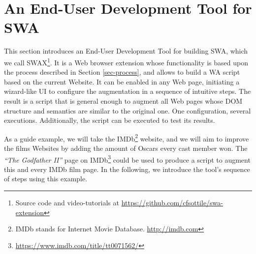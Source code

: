 \documentclass[runningheads,anonymous]{llncs}
\begin{document}
  
\section{An End-User Development Tool for SWA}
\label{sec-tool}

This section introduces an End-User Development Tool for building SWA, which we call SWAX\footnote{Source code and video-tutorials at \url{https://github.com/cfsottile/swa-extension}}. It is a Web browser extension whose functionality is based upon the process described in Section \ref{sec-process}, and allows to build a WA script based on the current Website. It can be enabled in any Web page, initiating a wizard-like UI to configure the augmentation in a sequence of intuitive steps. The result is a script that is general enough to augment all Web pages whose DOM structure and semantics are similar to the original one. One configuration, several executions. Additionally, the script can be executed to test its results.

As a guide example, we will take the IMDb\footnote{IMDb stands for Internet Movie Database. \url{http://imdb.com}} website, and we will aim to improve the films Websites by adding the amount of Oscars every cast member won. The \textit{``The Godfather II''} page on IMDb\footnote{\url{https://www.imdb.com/title/tt0071562/}} could be used to produce a script to augment this and every IMDb film page. In the following, we introduce the tool's sequence of steps using this example.
\end{document}
